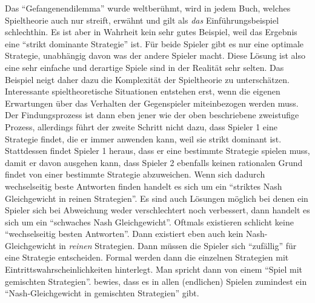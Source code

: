 Das "`Gefangenendilemma"' wurde weltberühmt, wird in jedem Buch, welches Spieltheorie auch nur streift, erwähnt und gilt als \textit{das} Einführungsbeispiel schlechthin. Es ist aber in Wahrheit kein sehr gutes Beispiel, weil das Ergebnis eine "`strikt dominante Strategie"' ist. Für beide Spieler gibt es nur eine optimale Strategie, unabhängig davon was der andere Spieler macht. Diese Lösung ist also eine sehr einfache und derartige Spiele sind in der Realität sehr selten. Das Beispiel neigt daher dazu die Komplexität der Spieltheorie zu unterschätzen. Interessante spieltheoretische Situationen entstehen erst, wenn die eigenen Erwartungen über das Verhalten der Gegenspieler miteinbezogen werden muss. Der Findungsprozess ist dann eben jener wie der oben beschriebene zweistufige Prozess, allerdings führt der zweite Schritt nicht dazu, dass Spieler 1 eine Strategie findet, die er immer anwenden kann, weil sie strikt dominant ist. Stattdessen findet Spieler 1 heraus, dass er eine bestimmte Strategie spielen muss, damit er davon ausgehen kann, dass Spieler 2 ebenfalls keinen rationalen Grund findet von einer bestimmte Strategie abzuweichen. Wenn sich dadurch wechselseitig beste Antworten finden handelt es sich um ein "`striktes Nash Gleichgewicht in reinen Strategien"'. Es sind auch Lösungen möglich bei denen ein Spieler sich bei Abweichung weder verschlechtert noch verbessert, dann handelt es sich um ein "`schwaches Nash Gleichgewicht"'. Oftmals existieren schlicht keine "`wechselseitig besten Antworten"'. Dann existiert eben auch kein Nash-Gleichgewicht in \textit{reinen} Strategien. Dann müssen die Spieler sich "`zufällig"' für eine Strategie entscheiden. Formal werden dann die einzelnen Strategien mit Eintrittswahrscheinlichkeiten hinterlegt. Man spricht dann von einem "`Spiel mit gemischten Strategien"'. \textcite{Nash1951} bewies, dass es in allen (endlichen) Spielen zumindest ein "`Nash-Gleichgewicht in gemischten Strategien"' gibt.


